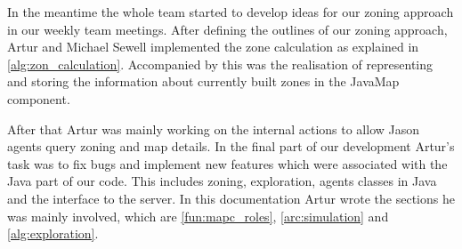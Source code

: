 In the meantime the whole team started to develop ideas for our zoning approach in our weekly team meetings.
After defining the outlines of our zoning approach, Artur and Michael Sewell implemented the zone calculation as explained in \autoref{alg:zon_calculation}.
Accompanied by this was the realisation of representing and storing the information about currently built zones in the JavaMap component.

After that Artur was mainly working on the internal actions to allow Jason agents query zoning and map details.
In the final part of our development Artur's task was to fix bugs and implement new features which were associated with the Java part of our code.
This includes zoning, exploration, agents classes in Java and the interface to the server.
In this documentation Artur wrote the sections he was mainly involved, which are \autoref{fun:mapc_roles}, \autoref{arc:simulation} and \autoref{alg:exploration}.
